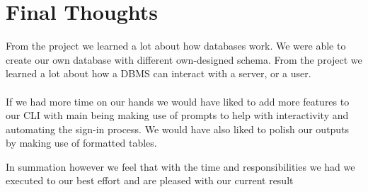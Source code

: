 \documentclass[12pt, lettersize]{article}
\theoremstyle{Remark}
\begin{document}
 	\section{Final Thoughts}
 
 		From the project we learned a lot about how databases work. We were able to create our own database with different own-designed schema. From the project we learned a lot about how a DBMS can interact with a server, or a user. \\\\
 		If we had more time on our hands we would have liked to add more features to our CLI with main being making use of prompts to help with interactivity and automating the sign-in process. We would have also liked to polish our outputs by making use of formatted tables.
 		
 		In summation however we feel that with the time and responsibilities we had we executed to our best effort and are pleased with our current result
 		
	
\end{document}
